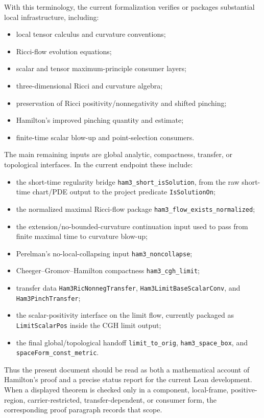 \documentclass[11pt]{article}
\theoremstyle{plain}
\theoremstyle{definition}
\theoremstyle{remark}
\newcommand{\leanref}[1]{\nolinkurl{#1}}
\begin{document}
With this terminology, the current formalization verifies or packages
substantial local infrastructure, including:
\begin{itemize}[leftmargin=2em]
  \item local tensor calculus and curvature conventions;
  \item Ricci-flow evolution equations;
  \item scalar and tensor maximum-principle consumer layers;
  \item three-dimensional Ricci and curvature algebra;
  \item preservation of Ricci positivity/nonnegativity and shifted pinching;
  \item Hamilton's improved pinching quantity and estimate;
  \item finite-time scalar blow-up and point-selection consumers.
\end{itemize}
The main remaining inputs are global analytic, compactness, transfer, or
topological interfaces.  In the current endpoint these include:
\begin{itemize}[leftmargin=2em]
  \item the short-time regularity bridge
    \leanref{ham3_short_isSolution}, from the raw short-time chart/PDE output to
    the project predicate \leanref{IsSolutionOn};
  \item the normalized maximal Ricci-flow package
    \leanref{ham3_flow_exists_normalized};
  \item the extension/no-bounded-curvature continuation input used to pass from
    finite maximal time to curvature blow-up;
  \item Perelman's no-local-collapsing input \leanref{ham3_noncollapse};
  \item Cheeger--Gromov--Hamilton compactness \leanref{ham3_cgh_limit};
  \item transfer data
    \leanref{Ham3RicNonnegTransfer},
    \leanref{Ham3LimitBaseScalarConv}, and
    \leanref{Ham3PinchTransfer};
  \item the scalar-positivity interface on the limit flow, currently packaged
    as \leanref{LimitScalarPos} inside the CGH limit output;
  \item the final global/topological handoff
    \leanref{limit_to_orig},
    \leanref{ham3_space_box}, and
    \leanref{spaceForm_const_metric}.
\end{itemize}
Thus the present document should be read as both a mathematical account of
Hamilton's proof and a precise status report for the current Lean development.
When a displayed theorem is checked only in a component, local-frame,
positive-region, carrier-restricted, transfer-dependent, or consumer form, the
corresponding proof paragraph records that scope.
\end{document}
